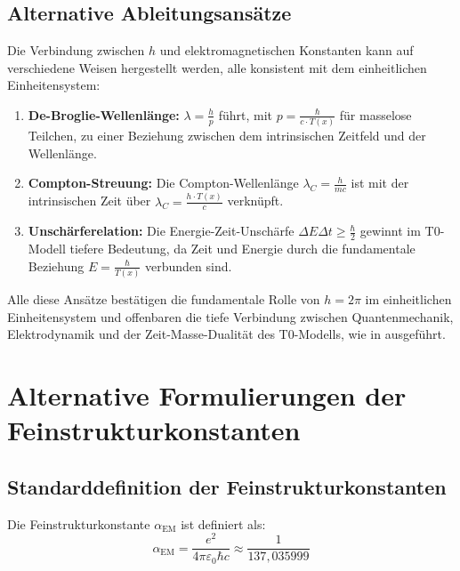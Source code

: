 \documentclass[12pt,a4paper]{article}
\newcommand{\Tfield}{T(x)}
\newcommand{\alphaEM}{\alpha_{\text{EM}}}
\begin{document}
	\subsection{Alternative Ableitungsansätze}
	\label{subsec:alternative_derivations}
	
	Die Verbindung zwischen \(h\) und elektromagnetischen Konstanten kann auf verschiedene Weisen hergestellt werden, alle konsistent mit dem einheitlichen Einheitensystem:
	
	\begin{enumerate}
		\item \textbf{De-Broglie-Wellenlänge:} \(\lambda = \frac{h}{p}\) führt, mit \(p = \frac{\hbar}{c \cdot \Tfield}\) für masselose Teilchen, zu einer Beziehung zwischen dem intrinsischen Zeitfeld und der Wellenlänge.
		\item \textbf{Compton-Streuung:} Die Compton-Wellenlänge \(\lambda_C = \frac{h}{mc}\) ist mit der intrinsischen Zeit über \(\lambda_C = \frac{h \cdot \Tfield}{c}\) verknüpft.
		\item \textbf{Unschärferelation:} Die Energie-Zeit-Unschärfe \(\Delta E \Delta t \geq \frac{\hbar}{2}\) gewinnt im T0-Modell tiefere Bedeutung, da Zeit und Energie durch die fundamentale Beziehung \(E = \frac{\hbar}{\Tfield}\) verbunden sind.
	\end{enumerate}
	
	Alle diese Ansätze bestätigen die fundamentale Rolle von \(h = 2\pi\) im einheitlichen Einheitensystem und offenbaren die tiefe Verbindung zwischen Quantenmechanik, Elektrodynamik und der Zeit-Masse-Dualität des T0-Modells, wie in \cite{pascher_zeit_2025} ausgeführt.
	
	\section{Alternative Formulierungen der Feinstrukturkonstanten}
	\label{sec:alternative_alpha}
	
	\subsection{Standarddefinition der Feinstrukturkonstanten}
	\label{subsec:standard_alpha}
	
	Die Feinstrukturkonstante \(\alphaEM\) ist definiert als:
	\begin{equation}
		\alphaEM = \frac{e^2}{4\pi \varepsilon_0 \hbar c} \approx \frac{1}{137,035999}
	\end{equation}
	
\end{document}
